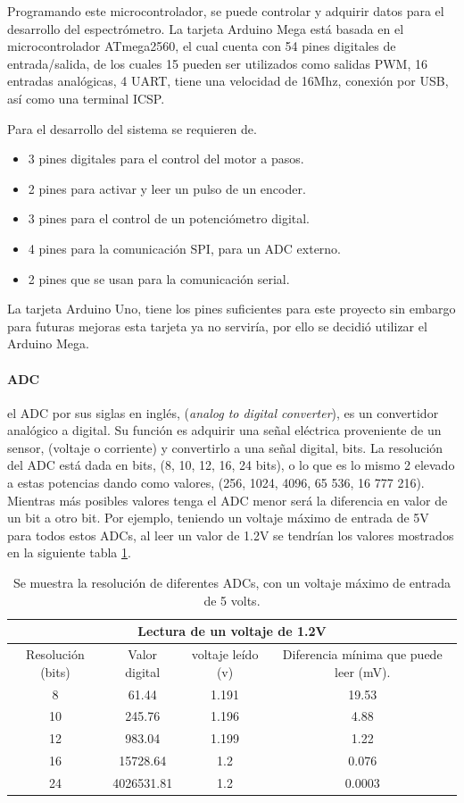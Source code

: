 Programando este microcontrolador, se puede controlar y adquirir datos para el desarrollo del espectrómetro. La tarjeta Arduino Mega está basada en el microcontrolador ATmega2560, el cual cuenta con 54 pines digitales de entrada/salida, de los cuales 15 pueden ser utilizados como salidas PWM, 16 entradas analógicas, 4 UART, tiene una velocidad de 16Mhz, conexión por USB, así como una terminal ICSP. 


Para el desarrollo del sistema se requieren de.
\begin{itemize}
	\item 3 pines digitales para el control del motor a pasos.
	\item 2 pines para activar y leer un pulso de un encoder.
	\item 3 pines para el control de un potenciómetro digital.
	\item 4 pines para la comunicación SPI, para un ADC externo.
	\item 2 pines que se usan para la comunicación serial.
\end{itemize}
La tarjeta Arduino Uno, tiene los pines suficientes para este proyecto sin embargo para futuras mejoras esta tarjeta ya no serviría, por ello se decidió utilizar el Arduino Mega.

\paragraph{ADC} el ADC por sus siglas en inglés, (\textit{analog to digital converter}), es un convertidor analógico a digital. Su función es adquirir una señal eléctrica proveniente de un sensor, (voltaje o corriente) y convertirlo a una señal digital, bits. 
La resolución del ADC está dada en bits, (8, 10, 12, 16, 24 bits), o lo que es lo mismo 2 elevado a estas potencias dando como valores, (256, 1024, 4096, 65 536, 16 777 216). Mientras más posibles valores tenga el ADC menor será la diferencia en valor de un bit a otro bit. Por ejemplo, teniendo un voltaje máximo de entrada de 5V para todos estos ADCs, al leer un valor de 1.2V se tendrían los valores mostrados en la siguiente tabla \ref{tabla:adcRe}.

\begin{table}[h]
\centering
\caption{Se muestra la resolución de diferentes ADCs, con un voltaje máximo de entrada de 5 volts.}
\label{tabla:adcRe}
\begin{tabular}{|c|c|c|c|}
	\hline 
	\multicolumn{4}{|c|}{Lectura de un voltaje de 1.2V} \\ 
	\hline 
	Resolución (bits) & Valor digital & voltaje leído (v) & Diferencia mínima que puede leer (mV).\\ 
	\hline 
	8  & 61.44 & 1.191 & 19.53 \\ 
	\hline 
	10 & 245.76  & 1.196 & 4.88\\ 
	\hline 
	12	& 983.04 & 1.199 & 1.22 \\ 
	\hline 
	16	& 15728.64 & 1.2 & 0.076 \\ 
	\hline 
	24	& 4026531.81 & 1.2 & 0.0003 \\ 
	\hline 
\end{tabular} 

\end{table}
